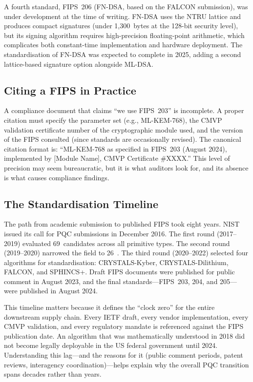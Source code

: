 A fourth standard, FIPS~206 (FN-DSA, based on the FALCON submission), was under development at the time of writing. FN-DSA uses the NTRU lattice and produces compact signatures (under 1,300~bytes at the 128-bit security level), but its signing algorithm requires high-precision floating-point arithmetic, which complicates both constant-time implementation and hardware deployment. The standardisation of FN-DSA was expected to complete in 2025, adding a second lattice-based signature option alongside ML-DSA.

\subsection{Citing a FIPS in Practice}
\label{subsec:citing-fips}

A compliance document that claims ``we use FIPS~203'' is incomplete. A proper citation must specify the parameter set (e.g., ML-KEM-768), the CMVP validation certificate number of the cryptographic module used, and the version of the FIPS consulted (since standards are occasionally revised). The canonical citation format is: ``ML-KEM-768 as specified in FIPS~203 (August 2024), implemented by [Module Name], CMVP Certificate \#XXXX.'' This level of precision may seem bureaucratic, but it is what auditors look for, and its absence is what causes compliance findings.

\subsection{The Standardisation Timeline}
\label{subsec:nist-timeline}

The path from academic submission to published FIPS took eight years. NIST issued its call for PQC submissions in December 2016. The first round (2017--2019) evaluated 69~candidates across all primitive types. The second round (2019--2020) narrowed the field to 26~\cite{NISTIR8309}. The third round (2020--2022) selected four algorithms for standardisation: CRYSTALS-Kyber, CRYSTALS-Dilithium, FALCON, and SPHINCS+. Draft FIPS documents were published for public comment in August 2023, and the final standards---FIPS~203, 204, and 205---were published in August 2024.

This timeline matters because it defines the ``clock zero'' for the entire downstream supply chain. Every IETF draft, every vendor implementation, every CMVP validation, and every regulatory mandate is referenced against the FIPS publication date. An algorithm that was mathematically understood in 2018 did not become legally deployable in the US federal government until 2024. Understanding this lag---and the reasons for it (public comment periods, patent reviews, interagency coordination)---helps explain why the overall PQC transition spans decades rather than years.

